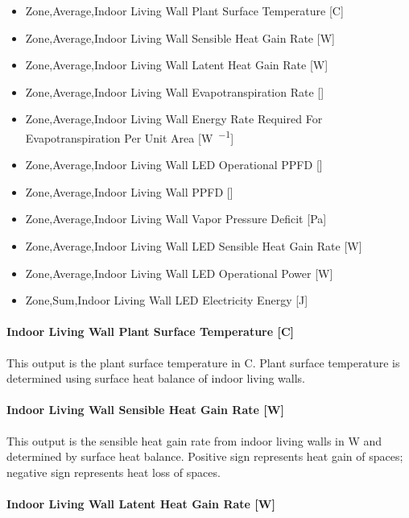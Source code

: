 \begin{itemize}
\tightlist
\item
  Zone,Average,Indoor Living Wall Plant Surface Temperature {[}C{]}
\item
  Zone,Average,Indoor Living Wall Sensible Heat Gain Rate {[}W{]}
\item
  Zone,Average,Indoor Living Wall Latent Heat Gain Rate {[}W{]}
\item
  Zone,Average,Indoor Living Wall Evapotranspiration Rate {[}\si{\evapotranspirationRate}{]}
\item
  Zone,Average,Indoor Living Wall Energy Rate Required For Evapotranspiration Per Unit Area {[}\si{\watt\per\area}{]}
\item
  Zone,Average,Indoor Living Wall LED Operational PPFD {[}\si{\umolperAreaperSecond}{]}
\item
  Zone,Average,Indoor Living Wall PPFD {[}\si{\umolperAreaperSecond}{]}
\item
  Zone,Average,Indoor Living Wall Vapor Pressure Deficit {[}Pa{]}
\item
  Zone,Average,Indoor Living Wall LED Sensible Heat Gain Rate {[}W{]}
\item
  Zone,Average,Indoor Living Wall LED Operational Power {[}W{]}
\item
  Zone,Sum,Indoor Living Wall LED Electricity Energy {[}J{]}
\end{itemize}

\paragraph{Indoor Living Wall Plant Surface Temperature {[}C{]}}\label{indoor-living-wall-plant-surface-temperature-c}

This output is the plant surface temperature in C. Plant surface temperature is determined using surface heat balance of indoor living walls.

\paragraph{Indoor Living Wall Sensible Heat Gain Rate {[}W{]}}\label{indoor-living-wall-sensible-heat-gain-rate-w}

This output is the sensible heat gain rate from indoor living walls in W and determined by surface heat balance. Positive sign represents heat gain of spaces; negative sign represents heat loss of spaces.

\paragraph{Indoor Living Wall Latent Heat Gain Rate {[}W{]}}\label{indoor-living-wall-latent-heat-gain-rate-w}

